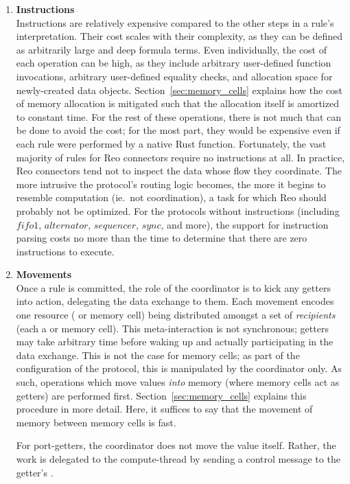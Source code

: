 \begin{enumerate}
	
	\item \textbf{Instructions}\\
	Instructions are relatively expensive compared to the other steps in a rule's interpretation. Their cost scales with their complexity, as they can be defined as arbitrarily large and deep formula terms. Even individually, the cost of each operation can be high, as they include arbitrary user-defined function invocations, arbitrary user-defined equality checks, and allocation space for newly-created data objects. Section~\ref{sec:memory_cells} explains how the cost of memory allocation is mitigated such that the allocation itself is amortized to constant time. For the rest of these operations, there is not much that can be done to avoid the cost; for the most part, they would be expensive even if each rule were performed by a native Rust function. Fortunately, the vast majority of rules for Reo connectors require no instructions at all. In practice, Reo connectors tend not to inspect the data whose flow they coordinate. The more intrusive the protocol's routing logic becomes, the more it begins to resemble computation (ie.\ not coordination), a task for which Reo should probably not be optimized. For the protocols without instructions (including $fifo1$, $alternator$, $sequencer$, $sync$, and more), the support for instruction parsing costs no more than the time to determine that there are zero instructions to execute.
	 
	 \item \textbf{Movements}\\
	 Once a rule is committed, the role of the coordinator is to kick any getters into action, delegating the data exchange to them. Each movement encodes one resource ( or memory cell) being distributed amongst a set of \textit{recipients} (each a  or memory cell). This meta-interaction is not synchronous; getters may take arbitrary time before waking up and actually participating in the data exchange. This is not the case for memory cells; as part of the configuration of the protocol, this is manipulated by the coordinator only. As such, operations which move values \textit{into} memory (where memory cells act as getters) are performed first. Section~\ref{sec:memory_cells} explains this procedure in more detail. Here, it suffices to say that the movement of memory between memory cells is fast.
	 
	 For port-getters, the coordinator does not move the value itself. Rather, the work is delegated to the compute-thread by sending a control message to the getter's . 
	 

\end{enumerate}
